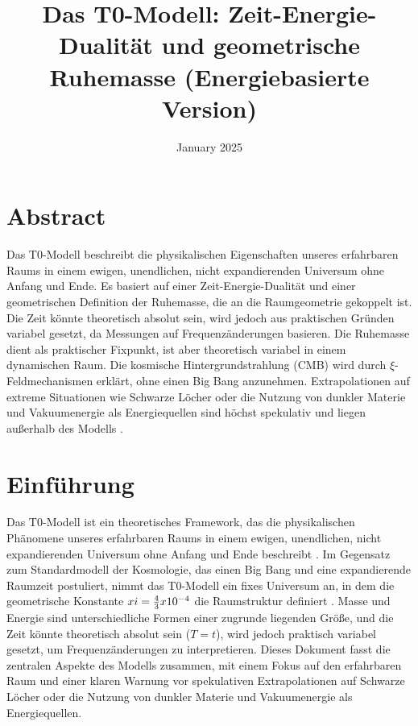 \documentclass[12pt,a4paper]{report}
\author{}
\date{January 2025}
\begin{document}
\title{Das T0-Modell: Zeit-Energie-Dualität und geometrische Ruhemasse (Energiebasierte Version)}
\maketitle


\section*{Abstract}
Das T0-Modell beschreibt die physikalischen Eigenschaften unseres erfahrbaren Raums in einem ewigen, unendlichen, nicht expandierenden Universum ohne Anfang und Ende. Es basiert auf einer Zeit-Energie-Dualität und einer geometrischen Definition der Ruhemasse, die an die Raumgeometrie gekoppelt ist. Die Zeit könnte theoretisch absolut sein, wird jedoch aus praktischen Gründen variabel gesetzt, da Messungen auf Frequenzänderungen basieren. Die Ruhemasse dient als praktischer Fixpunkt, ist aber theoretisch variabel in einem dynamischen Raum. Die kosmische Hintergrundstrahlung (CMB) wird durch \(\xi\)-Feldmechanismen erklärt, ohne einen Big Bang anzunehmen. Extrapolationen auf extreme Situationen wie Schwarze Löcher oder die Nutzung von dunkler Materie und Vakuumenergie als Energiequellen sind höchst spekulativ und liegen außerhalb des Modells \cite{pascher_t0_energie_2025}.
\tableofcontents
\section{Einführung}
\label{sec:einfuehrung}

Das T0-Modell ist ein theoretisches Framework, das die physikalischen Phänomene unseres erfahrbaren Raums in einem ewigen, unendlichen, nicht expandierenden Universum ohne Anfang und Ende beschreibt \cite{pascher_t0_energie_2025}. Im Gegensatz zum Standardmodell der Kosmologie, das einen Big Bang und eine expandierende Raumzeit postuliert, nimmt das T0-Modell ein fixes Universum an, in dem die geometrische Konstante \(xi = \frac{4}{3} x 10^{-4}\) die Raumstruktur definiert \cite{Casimir1948}. Masse und Energie sind unterschiedliche Formen einer zugrunde liegenden Größe, und die Zeit könnte theoretisch absolut sein (\( T = t \)), wird jedoch praktisch variabel gesetzt, um Frequenzänderungen zu interpretieren. Dieses Dokument fasst die zentralen Aspekte des Modells zusammen, mit einem Fokus auf den erfahrbaren Raum und einer klaren Warnung vor spekulativen Extrapolationen auf Schwarze Löcher oder die Nutzung von dunkler Materie und Vakuumenergie als Energiequellen.
\end{document}
